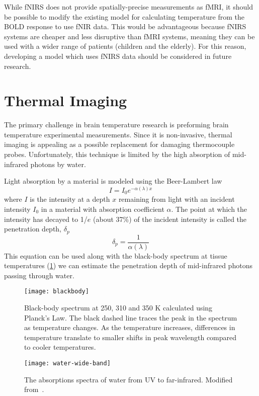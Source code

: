 While fNIRS does not provide spatially-precise measurements as fMRI, it should be possible to modify the existing model for calculating temperature from the BOLD response to use fNIR data. This would be advantageous because fNIRS systems are cheaper and less disruptive than fMRI systems, meaning they can be used with a wider range of patients (children and the elderly).  For this reason, developing a model which uses fNIRS data should be considered in future research.

\section{Thermal Imaging}

The primary challenge in brain temperature research is preforming brain temperature experimental measurements.  Since it is non-invasive, thermal imaging is appealing as a possible replacement for damaging thermocouple probes.  Unfortunately, this technique is limited by the high absorption of mid-infrared photons by water.

Light absorption by a material is modeled using the Beer-Lambert law
\begin{equation}
  I = I_0 e^{-\alpha (\lambda) x} \label{eq:beerlambert}
\end{equation}
where $I$ is the intensity at a depth $x$ remaining from light with an incident intensity $I_0$ in a material with absorption coefficient $\alpha$.  The point at which the intensity has decayed to 1/$e$ (about 37\%) of the incident intensity is called the penetration depth, $\delta_{p}$
\begin{equation}
  \delta_p = \frac{1}{\alpha (\lambda)} \label{eq:penetrationdepth}
\end{equation}
This equation can be used along with the black-body spectrum at tissue temperatures (\cref{fig:blackbody}) we can estimate the penetration depth of mid-infrared photons passing through water.

\begin{figure}[tb]
  \centering
  \texttt{[image: blackbody]}
  \caption[Black-body Spectrum at 250, 310 and 350 K]{\label{fig:blackbody}Black-body spectrum at 250, 310 and 350 K calculated using Planck's Law. The black dashed line traces the peak in the spectrum as temperature changes.  As the temperature increases, differences in temperature translate to smaller shifts in peak wavelength compared to cooler temperatures.}
\end{figure}
\begin{figure}[tb]
  \centering
  \texttt{[image: water-wide-band]}
  \caption[Wide-band absorption spectra of water]{\label{fig:waterabs}The absorptions spectra of water from UV to far-infrared.  Modified from~\citet{hale73}.}
\end{figure}

